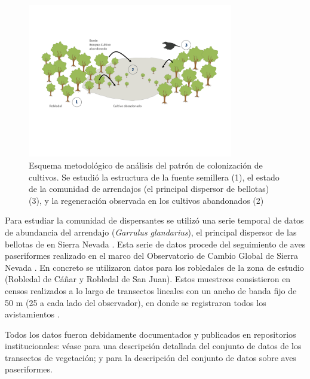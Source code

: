 \begin{figure}
    \centering
    \includegraphics[width=0.8\textwidth]{img/metodologia/metodologia-coloniza.pdf}
    \caption{Esquema metodológico de análisis del patrón de colonización de cultivos. Se estudió la estructura de la fuente semillera (1), el estado de la comunidad de arrendajos (el principal dispersor de bellotas)(3), y la regeneración observada en los cultivos abandonados (2)}
    \label{fig:metodologia:coloniza}
\end{figure}

Para estudiar la comunidad de dispersantes se utilizó una serie temporal de datos de abundancia del arrendajo (\emph{Garrulus glandarius}), el principal dispersor de las bellotas de \Qpy en Sierra Nevada \autocite[][]{Gomez2003ImpactVertebrate}. Esta serie de datos procede del seguimiento de aves paseriformes realizado en el marco del Observatorio de Cambio Global de Sierra Nevada \autocites{Zamoraetal2017MonitoringGlobal,BareaAzconetal2012PasseriformesOtras}. En concreto se utilizaron datos para los robledales de la zona de estudio (Robledal de Cáñar y Robledal de San Juan). Estos muestreos consistieron en censos realizados a lo largo de transectos lineales con un ancho de banda fijo de 50 m (25 a cada lado del observador), en donde se registraron todos los avistamientos \autocites{BareaAzconetal2012PasseriformesOtrasa, ZamoraBareaAzcon2015LongTermChanges}. 

Todos los datos fueron debidamente documentados y publicados en repositorios institucionales: véase \citet{PerezLuqueetal2015DatasetMIGRAME} para una descripción detallada del conjunto de datos de los transectos de vegetación; y \citet{PerezLuqueetal2016DatasetPasserine} para la descripción del conjunto de datos sobre aves paseriformes. 

